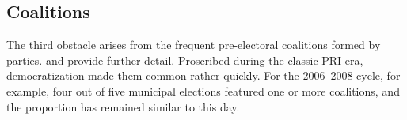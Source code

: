 \documentclass[letter,12pt]{article}
\newcommand{\mc}{\multicolumn}
\begin{document}


\subsection{Coalitions}

\noindent The third obstacle arises from the frequent pre-electoral coalitions formed by parties. \citet{magar.el.dataset.2026} and \citet{spoon.pulido.PRI-PVEM2017} provide further detail. Proscribed during the classic PRI era, democratization made them common rather quickly. For the 2006--2008 cycle, for example, four out of five municipal elections featured one or more coalitions, and the proportion has remained similar to this day.
\end{document}
